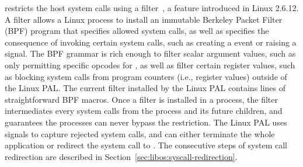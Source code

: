 



\graphene{} restricts the host system calls 
using a \seccomp{} %
filter~\cite{seccomp}, a feature introduced in Linux 2.6.12.
A \seccomp{} filter allows a Linux process to install an immutable Berkeley Packet Filter (BPF) program
that specifies allowed system calls, as well as specifies
the consequence of invoking certain system calls, such as creating a  event or raising a  signal.
The BPF grammar is rich enough to filter scalar argument values,
such as only permitting specific opcodes for ,
as well as filter certain register values, such as blocking system calls from program counters (i.e.,  register values) outside of the Linux PAL.
The current \seccomp{} filter installed by the Linux PAL contains \seccomplines{} lines of straightforward BPF macros.  %
Once a \seccomp{} filter is installed in a process,
the filter intermediates
every system calls from the process and its future children, and guarantees the processes can never bypass the restriction.
The Linux PAL uses  signals to capture rejected system calls,
and can either terminate the whole application or
redirect the system call to \thelibos{}.
The consecutive steps of system call redirection are described in Section~\ref{sec:libos:syscall-redirection}.



